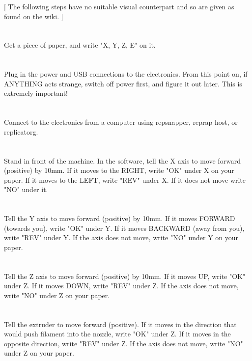 \documentclass[twoside,a4paper,titlepage]{memoir}
\begin{document}
	[ The following steps have no suitable visual counterpart and so are given as found on the wiki. ]
	
	\section{}
	Get a piece of paper, and write "X, Y, Z, E" on it.
	
	\section{}
	Plug in the power and USB connections to the electronics. From this point on, if ANYTHING acts
	strange, switch off power first, and figure it out later. This is extremely important!
	
	\section{}
	Connect to the electronics from a computer using repsnapper, reprap host, or replicatorg.
	
	\section{}
	Stand in front of the machine. In the software, tell the X axis to move forward (positive) by 10mm. If it
	moves to the RIGHT, write "OK" under X on your paper. If it moves to the LEFT, write "REV" under X. If
	it does not move write "NO" under it.
	
	\section{}
	Tell the Y axis to move forward (positive) by 10mm. If it moves FORWARD (towards you), write "OK"
	under Y. If it moves BACKWARD (away from you), write "REV" under Y. If the axis does not move,
	write "NO" under Y on your paper.
	
	\section{}
	Tell the Z axis to move forward (positive) by 10mm. If it moves UP, write "OK" under Z. If it moves
	DOWN, write "REV" under Z. If the axis does not move, write "NO" under Z on your paper.
	
	\section{}
	Tell the extruder to move forward (positive). If it moves in the direction that would push filament into the 		nozzle, write "OK" under Z. If it moves in the opposite direction, write "REV" under Z. If the axis
	does not move, write "NO" under Z on your paper.
	
\end{document}
